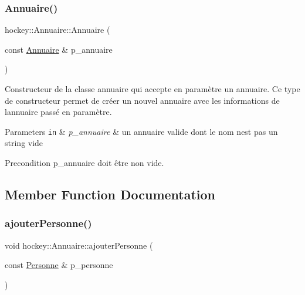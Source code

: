 \subsubsection{\texorpdfstring{Annuaire()}{Annuaire()}\hspace{0.1cm}{\footnotesize\ttfamily [2/2]}}
{\footnotesize\ttfamily hockey\+::\+Annuaire\+::\+Annuaire (\begin{DoxyParamCaption}\item[{const \hyperlink{classhockey_1_1Annuaire}{Annuaire} \&}]{p\+\_\+annuaire }\end{DoxyParamCaption})}



Constructeur de la classe annuaire qui accepte en paramètre un annuaire. Ce type de constructeur permet de créer un nouvel annuaire avec les informations de l\textquotesingle{}annuaire passé en paramètre. 


\begin{DoxyParams}[1]{Parameters}
\mbox{\tt in}  & {\em p\+\_\+annuaire} & un annuaire valide dont le nom n\textquotesingle{}est pas un string vide \\
\hline
\end{DoxyParams}
\begin{DoxyPrecond}{Precondition}
p\+\_\+annuaire doit être non vide. 
\end{DoxyPrecond}


\subsection{Member Function Documentation}
\mbox{\label{classhockey_1_1Annuaire_a14257b2cc11fc7bc5fc2c930c4c23785}} 
\subsubsection{\texorpdfstring{ajouter\+Personne()}{ajouterPersonne()}}
{\footnotesize\ttfamily void hockey\+::\+Annuaire\+::ajouter\+Personne (\begin{DoxyParamCaption}\item[{const \hyperlink{classhockey_1_1Personne}{Personne} \&}]{p\+\_\+personne }\end{DoxyParamCaption})}



